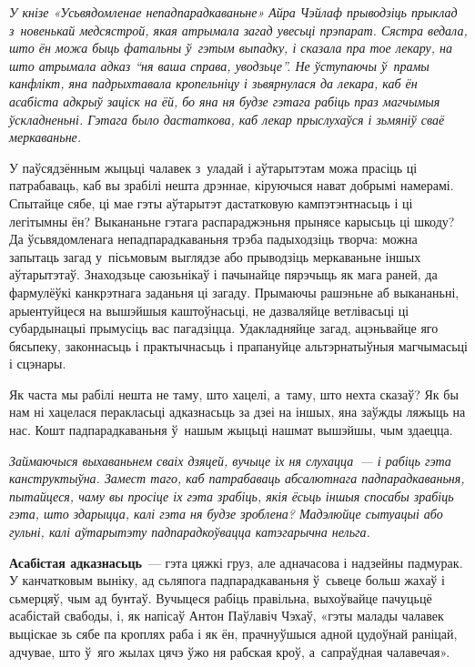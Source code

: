 \emph{У кнізе «Усьвядомленае непадпарадкаваньне» Айра Чэйлаф прыводзіць прыклад з~новенькай медсястрой, якая атрымала загад увесьці прэпарат. Сястра ведала, што ён можа быць фатальны ў~гэтым выпадку, і сказала пра тое лекару, на што атрымала адказ ``ня ваша справа, уводзьце''. Не ўступаючы ў~прамы канфлікт, яна падрыхтавала кропельніцу і зьвярнулася да лекара, каб ён асабіста адкрыў заціск на ёй, бо яна ня будзе гэтага рабіць праз магчымыя ўскладненьні. Гэтага было дастаткова, каб лекар прыслухаўся і зьмяніў сваё меркаваньне.} 

У паўсядзённым жыцьці чалавек з~уладай і аўтарытэтам можа прасіць ці патрабаваць, каб вы зрабілі нешта дрэннае, кіруючыся нават добрымі намерамі. Спытайце сябе, ці мае гэты аўтарытэт дастатковую кампэтэнтнасьць і ці легітымны ён? Выкананьне гэтага распараджэньня прынясе карысьць ці шкоду? Да ўсьвядомленага непадпарадкаваньня трэба падыходзіць творча: можна запытаць загад у~пісьмовым выглядзе або прыводзіць меркаваньне іншых аўтарытэтаў. Знаходзьце саюзьнікаў і пачынайце пярэчыць як мага раней, да фармулёўкі канкрэтнага заданьня ці загаду. Прымаючы рашэньне аб выкананьні, арыентуйцеся на вышэйшыя каштоўнасьці, не дазваляйце ветлівасьці ці субардынацыі прымусіць вас пагадзіцца. Удакладняйце загад, ацэньвайце яго бясьпеку, законнасьць і практычнасьць і прапануйце альтэрнатыўныя магчымасьці і сцэнары.


Як часта мы рабілі нешта не таму, што хацелі, а~таму, што нехта сказаў? Як бы нам ні хацелася перакласьці адказнасьць за дзеі на іншых, яна заўжды ляжыць на нас. Кошт падпарадкаваньня ў~нашым жыцьці нашмат вышэйшы, чым здаецца.

\emph{Займаючыся выхаваньнем сваіх дзяцей, вучыце іх ня слухацца~--- і рабіць гэта канструктыўна. Замест таго, каб патрабаваць абсалютнага падпарадкаваньня, пытайцеся, чаму вы просіце іх гэта зрабіць, якія ёсьць іншыя спосабы зрабіць гэта, што здарыцца, калі гэта ня будзе зроблена? Мадэлюйце сытуацыі або гульні, калі аўтарытэту падпарадкоўвацца катэгарычна нельга.} 

\textbf{Асабістая адказнасьць}~--- гэта цяжкі груз, але адначасова і надзейны падмурак. У канчатковым выніку, ад сьляпога падпарадкаваньня ў~сьвеце больш жахаў і сьмерцяў, чым ад бунтаў. Вучыцеся рабіць правільна, выхоўвайце пачуцьцё асабістай свабоды, і, як напісаў Антон Паўлавіч Чэхаў, «гэты малады чалавек выціскае зь сябе па кроплях раба і як ён, прачнуўшыся адной цудоўнай раніцай, адчувае, што ў~яго жылах цячэ ўжо ня рабская кроў, а~сапраўдная чалавечая».

